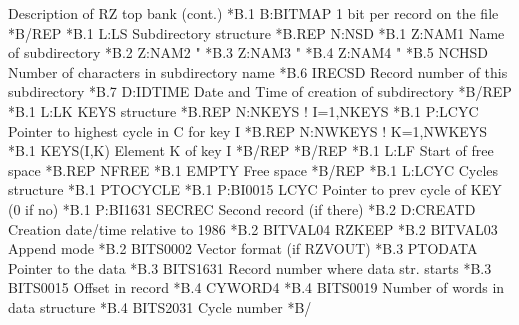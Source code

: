 \begin{landscapebody}
\NODOC{\end{minipage}
\hspace*{2mm}
\begin{minipage}[t]{.49\hsize}}
\begin{XMPt}{Description of RZ top bank (cont.)}
*B.1     B:BITMAP      1 bit per record on the file                       
*B/REP
*B.1     L:LS          Subdirectory  structure
*B.REP               N:NSD            
*B.1     Z:NAM1        Name of subdirectory                   
*B.2     Z:NAM2        "                                          
*B.3     Z:NAM3        "                                          
*B.4     Z:NAM4        "                                          
*B.5     NCHSD         Number of characters in subdirectory name  
*B.6     IRECSD        Record number of this subdirectory         
*B.7     D:IDTIME      Date and Time of creation of subdirectory  
*B/REP
*B.1     L:LK          KEYS structure
*B.REP               N:NKEYS        ! I=1,NKEYS   
*B.1     P:LCYC        Pointer to highest cycle in C for key I
*B.REP               N:NWKEYS       ! K=1,NWKEYS 
*B.1     KEYS(I,K)     Element K of key I                     
*B/REP
*B/REP
*B.1     L:LF          Start of free space
*B.REP   NFREE
*B.1     EMPTY         Free space
*B/REP
*B.1     L:LCYC        Cycles structure
*B.1     PTOCYCLE       
*B.1     P:BI0015      LCYC Pointer to prev cycle of KEY (0 if no)
*B.1     P:BI1631      SECREC Second record (if there)
*B.2     D:CREATD      Creation date/time relative to 1986
*B.2     BITVAL04      RZKEEP
*B.2     BITVAL03      Append mode
*B.2     BITS0002      Vector format (if RZVOUT)
*B.3     PTODATA       Pointer to the data
*B.3     BITS1631      Record number where data str. starts
*B.3     BITS0015      Offset in record
*B.4     CYWORD4       
*B.4     BITS0019      Number of words in data structure
*B.4     BITS2031      Cycle number
*B/
\end{XMPt} 
\NODOC{\end{minipage}}
 
\end{landscapebody} 
    
